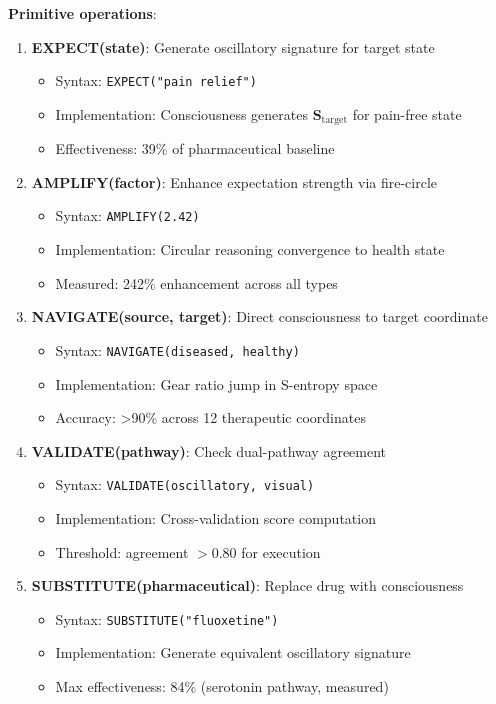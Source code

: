 \documentclass[11pt,a4paper]{article}
\begin{document}
\textbf{Primitive operations}:

\begin{enumerate}
\item \textbf{EXPECT(state)}: Generate oscillatory signature for target state
\begin{itemize}
\item Syntax: \texttt{EXPECT("pain relief")}
\item Implementation: Consciousness generates $\mathbf{S}_{\text{target}}$ for pain-free state
\item Effectiveness: 39\% of pharmaceutical baseline
\end{itemize}

\item \textbf{AMPLIFY(factor)}: Enhance expectation strength via fire-circle
\begin{itemize}
\item Syntax: \texttt{AMPLIFY(2.42)}
\item Implementation: Circular reasoning convergence to health state
\item Measured: 242\% enhancement across all types
\end{itemize}

\item \textbf{NAVIGATE(source, target)}: Direct consciousness to target coordinate
\begin{itemize}
\item Syntax: \texttt{NAVIGATE(diseased, healthy)}
\item Implementation: Gear ratio jump in S-entropy space
\item Accuracy: >90\% across 12 therapeutic coordinates
\end{itemize}

\item \textbf{VALIDATE(pathway)}: Check dual-pathway agreement
\begin{itemize}
\item Syntax: \texttt{VALIDATE(oscillatory, visual)}
\item Implementation: Cross-validation score computation
\item Threshold: agreement $>0.80$ for execution
\end{itemize}

\item \textbf{SUBSTITUTE(pharmaceutical)}: Replace drug with consciousness
\begin{itemize}
\item Syntax: \texttt{SUBSTITUTE("fluoxetine")}
\item Implementation: Generate equivalent oscillatory signature
\item Max effectiveness: 84\% (serotonin pathway, measured)
\end{itemize}
\end{enumerate}
\end{document}

